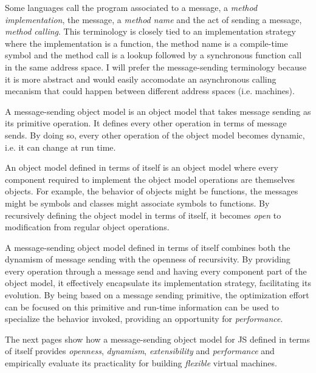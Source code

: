 Some languages call the program associated to a message, a \textit{method
implementation}, the message, a \textit{method name} and the act of sending a
message, \textit{method calling}. This terminology is closely tied to an
implementation strategy where the implementation is a function, the method name
is a compile-time symbol and the method call is a lookup followed by a
synchronous function call in the same address space. I will prefer the
message-sending terminology because it is more abstract and would easily
accomodate an asynchronous calling mecanism that could happen between different
address spaces (i.e. machines). 

A message-sending object model is an object model that takes message sending as
its primitive operation. It defines every other operation in terms of message
sends. By doing so, every other operation of the object model becomes dynamic,
i.e. it can change at run time.

An object model defined in terms of itself is an object model where every
component required to implement the object model operations are themselves
objects. For example, the behavior of objects might be functions, the messages
might be symbols and classes might associate symbols to functions. By
recursively defining the object model in terms of itself, it becomes
\textit{open} to modification from regular object operations.

A message-sending object model defined in terms of itself combines both the
dynamism of message sending with the openness of recursivity. By providing
every operation through a message send and having every component part of the
object model, it effectively encapsulate its implementation strategy,
facilitating its evolution. By being based on a message sending primitive, the
optimization effort can be focused on this primitive and run-time information
can be used to specialize the behavior invoked, providing an opportunity for
\textit{performance}. 

The next pages show how a message-sending object model for JS defined in terms of
itself provides \textit{openness}, \textit{dynamism}, \textit{extensibility}
and \textit{performance} and empirically evaluate its practicality for building
\textit{flexible} virtual machines.

